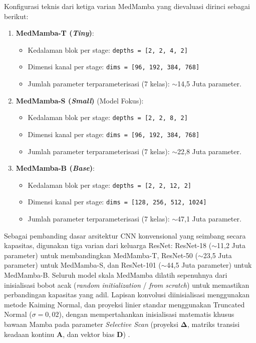 Konfigurasi teknis dari ketiga varian MedMamba yang dievaluasi dirinci sebagai berikut:
\begin{enumerate}[noitemsep]
	\item \textbf{MedMamba-T (\textit{Tiny})}:
	\begin{itemize}[noitemsep]
		\item Kedalaman blok per stage: \texttt{depths = [2, 2, 4, 2]}
		\item Dimensi kanal per stage: \texttt{dims = [96, 192, 384, 768]}
		\item Jumlah parameter terparameterisasi (7 kelas): $\sim$14,5 Juta parameter.
	\end{itemize}
	\item \textbf{MedMamba-S (\textit{Small})} (Model Fokus):
	\begin{itemize}[noitemsep]
		\item Kedalaman blok per stage: \texttt{depths = [2, 2, 8, 2]}
		\item Dimensi kanal per stage: \texttt{dims = [96, 192, 384, 768]}
		\item Jumlah parameter terparameterisasi (7 kelas): $\sim$22,8 Juta parameter.
	\end{itemize}
	\item \textbf{MedMamba-B (\textit{Base})}:
	\begin{itemize}[noitemsep]
		\item Kedalaman blok per stage: \texttt{depths = [2, 2, 12, 2]}
		\item Dimensi kanal per stage: \texttt{dims = [128, 256, 512, 1024]}
		\item Jumlah parameter terparameterisasi (7 kelas): $\sim$47,1 Juta parameter.
	\end{itemize}
\end{enumerate}
Sebagai pembanding dasar arsitektur CNN konvensional yang seimbang secara kapasitas, digunakan tiga varian dari keluarga ResNet: ResNet-18 ($\sim$11,2 Juta parameter) untuk membandingkan MedMamba-T, ResNet-50 ($\sim$23,5 Juta parameter) untuk MedMamba-S, dan ResNet-101 ($\sim$44,5 Juta parameter) untuk MedMamba-B. Seluruh model skala MedMamba dilatih sepenuhnya dari inisialisasi bobot acak (\textit{random initialization} / \textit{from scratch}) untuk memastikan perbandingan kapasitas yang adil. Lapisan konvolusi diinisialisasi menggunakan metode Kaiming Normal, dan proyeksi linier standar menggunakan Truncated Normal ($\sigma=0,02$), dengan mempertahankan inisialisasi matematis khusus bawaan Mamba pada parameter \textit{Selective Scan} (proyeksi $\mathbf{\Delta}$, matriks transisi keadaan kontinu $\mathbf{A}$, dan vektor bias $\mathbf{D}$) \cite{gu2024mamba}. \par

